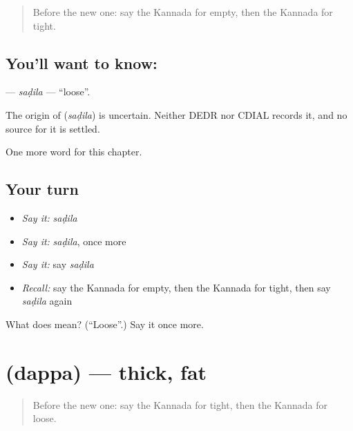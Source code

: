 \label{lesson:KA-C217-sadila}



\begin{quote}
Before the new one: say the Kannada for empty, then the Kannada for tight.
\end{quote}

\subsection*{You'll want to know: }
\textbf{} — \emph{saḍila} — \textquotedblleft{}loose\textquotedblright{}.

\begin{cousinweb}
The origin of \textbf{} (\emph{saḍila}) is uncertain. Neither DEDR nor CDIAL records it, and no source for it is settled.
\end{cousinweb}

\begin{grammarlens}[title={What you've built}]
One more word for this chapter.
\end{grammarlens}

\subsection*{Your turn}
\begin{itemize}
\raggedright
  \item \emph{Say it:} \emph{saḍila}
  \item \emph{Say it:} \emph{saḍila}, once more
  \item \emph{Say it:} say \emph{saḍila}
  \item \emph{Recall:} say the Kannada for empty, then the Kannada for tight, then say \emph{saḍila} again
\end{itemize}

\begin{tcolorbox}[breakable,colback=teal!4,colframe=teal!35!black,title={Before you move on}]
What does  mean? (\textquotedblleft{}Loose\textquotedblright{}.) Say it once more.
\end{tcolorbox}
\section[\texorpdfstring{\kn{ದಪ್ಪ} (dappa)}{ದಪ್ಪ (dappa)}]{ (dappa) — thick, fat}

\label{lesson:KA-C217-dappa}



\begin{quote}
Before the new one: say the Kannada for tight, then the Kannada for loose.
\end{quote}

